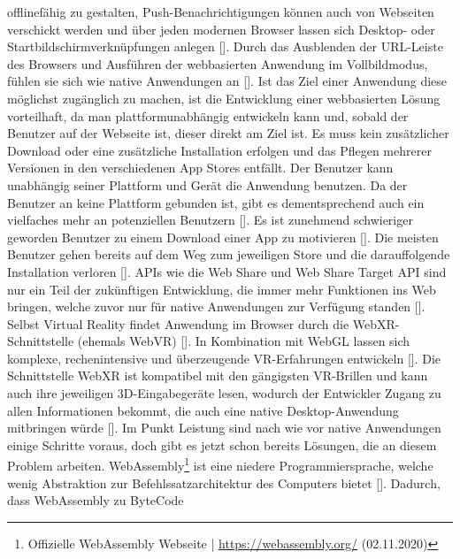 \documentclass[a4paper,12pt,oneside]{article}
\begin{document}
        offlinefähig zu gestalten, Push-Benachrichtigungen können auch von Webseiten verschickt
        werden und über jeden modernen Browser lassen sich Desktop- oder 
        Startbildschirmverknüpfungen anlegen [\cite[5-6]{Ater2017}]. 
        Durch das Ausblenden der URL-Leiste des Browsers
        und Ausführen der webbasierten Anwendung im Vollbildmodus, fühlen sie sich wie
        native Anwendungen an [\cite[6]{Ater2017}]. Ist das Ziel einer Anwendung diese
        möglichst zugänglich zu machen, ist die Entwicklung einer webbasierten Lösung
        vorteilhaft, da man plattformunabhängig entwickeln kann und, sobald der
        Benutzer auf der Webseite ist, dieser direkt am Ziel ist. Es muss kein zusätzlicher
        Download oder eine zusätzliche Installation erfolgen und das Pflegen mehrerer
        Versionen in den verschiedenen App Stores entfällt. Der Benutzer kann unabhängig
        seiner Plattform und Gerät die Anwendung benutzen. Da der Benutzer an keine Plattform
        gebunden ist, gibt es dementsprechend auch ein vielfaches mehr an potenziellen
        Benutzern [\cite[3]{Ater2017}].
        Es ist zunehmend schwieriger geworden Benutzer zu einem Download einer App 
        zu motivieren [\cite[3]{Ater2017}].
        Die meisten Benutzer gehen bereits auf dem Weg zum jeweiligen Store und die darauffolgende
        Installation verloren [\cite[4]{Ater2017}]. APIs wie die Web Share und Web Share Target
        API sind nur ein Teil der zukünftigen Entwicklung, die immer mehr Funktionen ins
        Web bringen, welche zuvor nur für native Anwendungen zur Verfügung standen [\cite[245]{Ater2017}].
        Selbst Virtual Reality findet Anwendung im Browser durch die WebXR-Schnittstelle 
        (ehemals WebVR) [\cite[245]{Ater2017}]. In Kombination mit WebGL lassen sich komplexe,
        rechenintensive und überzeugende VR-Erfahrungen entwickeln [\cite[245]{Ater2017}].
        Die Schnittstelle WebXR ist kompatibel mit den gängigsten VR-Brillen und kann auch
        ihre jeweiligen 3D-Eingabegeräte lesen, wodurch der Entwickler Zugang zu allen Informationen
        bekommt, die auch eine native Desktop-Anwendung mitbringen würde [\cite[245]{Ater2017}].
        Im Punkt Leistung sind nach wie vor native Anwendungen einige Schritte voraus, doch
        gibt es jetzt schon bereits Lösungen, die an diesem Problem arbeiten. WebAssembly\footnote{Offizielle WebAssembly Webseite | \url{https://webassembly.org/} (02.11.2020)}
        ist eine niedere Programmiersprache, welche wenig Abstraktion zur Befehlssatzarchitektur
        des Computers bietet [\cite[185]{Haas2017Jun}]. Dadurch, dass WebAssembly zu ByteCode
\end{document}
